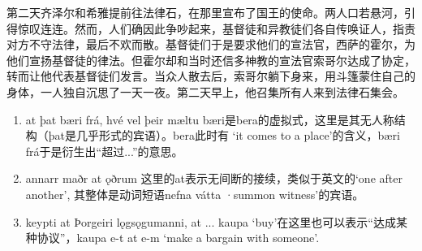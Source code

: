 \begin{translation*}{}
    第二天齐泽尔和希雅提前往法律石，在那里宣布了国王的使命。两人口若悬河，引得惊叹连连。然而，人们确因此争吵起来，基督徒和异教徒们各自传唤证人，指责对方不守法律，最后不欢而散。基督徒们于是要求他们的宣法官，西萨的霍尔，为他们宣扬基督徒的律法。但霍尔却和当时还信多神教的宣法官索哥尔达成了协定，转而让他代表基督徒们发言。当众人散去后，索哥尔躺下身来，用斗篷蒙住自己的身体，一人独自沉思了一天一夜。第二天早上，他召集所有人来到法律石集会。
\end{translation*}
\begin{grammar*}{}
    \begin{enumerate}[leftmargin=*]
        \item at þat bæri frá, hvé vel þeir mæltu
              bæri是bera的虚拟式，这里是其无人称结构（þat是几乎形式的宾语）。bera此时有 `it comes to a place'的含义，bæri frá于是衍生出“超过...”的意思。
        \item annarr maðr at ǫðrum
              这里的at表示无间断的接续，类似于英文的`one after another', 其整体是动词短语nefna vátta ·summon witness'的宾语。
        \item keypti at Þorgeiri lǫgsǫgumanni, at ...
              kaupa `buy'在这里也可以表示“达成某种协议”，kaupa e-t at e-m `make a bargain with someone'.

    \end{enumerate}
\end{grammar*}
